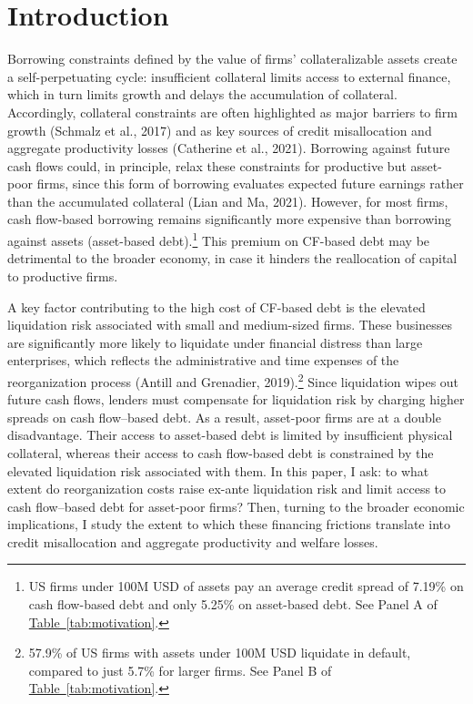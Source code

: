 \documentclass[12pt]{article}
\begin{document}
\section{Introduction \label{sec:introduction}} 

Borrowing constraints defined by the value of firms' collateralizable assets create a self-perpetuating cycle: insufficient collateral limits access to external finance, which in turn limits growth and delays the accumulation of collateral. Accordingly, collateral constraints are often highlighted as major barriers to firm growth (Schmalz et al., 2017) and as key sources of credit misallocation and aggregate productivity losses (Catherine et al., 2021). Borrowing against future cash flows could, in principle, relax these constraints for productive but asset-poor firms, since this form of borrowing evaluates expected future earnings rather than the accumulated collateral (Lian and Ma, 2021). However, for most firms, cash flow-based borrowing remains significantly more expensive than borrowing against assets (asset-based debt).\footnote{US firms under 100M USD of assets pay an average credit spread of 7.19\% on cash flow-based debt and only 5.25\% on asset-based debt. See Panel A of \hyperref[tab:motivation]{{Table~\ref*{tab:motivation}}}.} This premium on CF-based debt may be detrimental to the broader economy, in case it hinders the reallocation of capital to productive firms.

A key factor contributing to the high cost of CF-based debt is the elevated liquidation risk associated with small and medium-sized firms. These businesses are significantly more likely to liquidate under financial distress than large enterprises, which reflects the administrative and time expenses of the reorganization process (Antill and Grenadier, 2019).\footnote{57.9\% of US firms with assets under 100M USD liquidate in default, compared to just 5.7\% for larger firms. See Panel B of \hyperref[tab:motivation]{{Table~\ref*{tab:motivation}}}.} Since liquidation wipes out future cash flows, lenders must compensate for liquidation risk by charging higher spreads on cash flow–based debt. As a result, asset-poor firms are at a double disadvantage. Their access to asset-based debt is limited by insufficient physical collateral, whereas their access to cash flow-based debt is constrained by the elevated liquidation risk associated with them. In this paper, I ask: to what extent do reorganization costs raise ex-ante liquidation risk and limit access to cash flow–based debt for asset-poor firms? Then, turning to the broader economic implications, I study the extent to which these financing frictions translate into credit misallocation and aggregate productivity and welfare losses.
\end{document}
